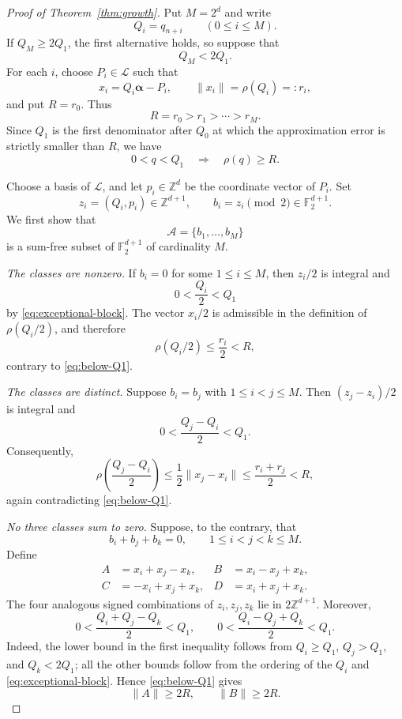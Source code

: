 \documentclass[10pt,a4paper]{amsart}
\newcommand{\F}{\mathbb F}
\newcommand{\Z}{\mathbb Z}
\newcommand{\balpha}{\boldsymbol{\alpha}}
\newcommand{\cL}{\mathcal L}
\begin{document}
\begin{proof}[Proof of Theorem~\ref{thm:growth}]
Put $M=2^d$ and write
$$
 Q_i=q_{n+i}\qquad(0\le i\le M).
$$
If $Q_M\ge2Q_1$, the first alternative holds, so suppose that
\begin{equation}\label{eq:exceptional-block}
 Q_M<2Q_1.
\end{equation}
For each $i$, choose $P_i\in\cL$ such that
$$
 x_i=Q_i\balpha-P_i,
 \qquad \|x_i\|=\rho(Q_i)=:r_i,
$$
and put $R=r_0$. Thus
\begin{equation}\label{eq:errors}
 R=r_0>r_1>\cdots>r_M.
\end{equation}
Since $Q_1$ is the first denominator after $Q_0$ at which the approximation
error is strictly smaller than $R$, we have
\begin{equation}\label{eq:below-Q1}
 0<q<Q_1\quad\Longrightarrow\quad \rho(q)\ge R.
\end{equation}

Choose a basis of $\cL$, and let $p_i\in\Z^d$ be the coordinate vector of
$P_i$. Set
$$
 z_i=(Q_i,p_i)\in\Z^{d+1},
 \qquad b_i=z_i\pmod 2\in\F_2^{d+1}.
$$
We first show that
$$
 \mathcal A=\{b_1,\ldots,b_M\}
$$
is a sum-free subset of $\F_2^{d+1}$ of cardinality $M$.

\smallskip
\noindent\emph{The classes are nonzero.}
If $b_i=0$ for some $1\le i\le M$, then $z_i/2$ is integral and
$$
 0<\frac{Q_i}{2}<Q_1
$$
by \eqref{eq:exceptional-block}. The vector $x_i/2$ is admissible in the
definition of $\rho(Q_i/2)$, and therefore
$$
 \rho(Q_i/2)\le\frac{r_i}{2}<R,
$$
contrary to \eqref{eq:below-Q1}.

\smallskip
\noindent\emph{The classes are distinct.}
Suppose $b_i=b_j$ with $1\le i<j\le M$. Then $(z_j-z_i)/2$ is integral and
$$
 0<\frac{Q_j-Q_i}{2}<Q_1.
$$
Consequently,
$$
 \rho\left(\frac{Q_j-Q_i}{2}\right)
 \le\frac12\|x_j-x_i\|
 \le\frac{r_i+r_j}{2}<R,
$$
again contradicting \eqref{eq:below-Q1}.

\smallskip
\noindent\emph{No three classes sum to zero.}
Suppose, to the contrary, that
\begin{equation}\label{eq:zero-sum-triple}
 b_i+b_j+b_k=0,
 \qquad 1\le i<j<k\le M.
\end{equation}
Define
$$
 \begin{aligned}
 A&=x_i+x_j-x_k,&
 B&=x_i-x_j+x_k,\\
 C&=-x_i+x_j+x_k,&
 D&=x_i+x_j+x_k.
 \end{aligned}
$$
The four analogous signed combinations of $z_i,z_j,z_k$ lie in
$2\Z^{d+1}$. Moreover,
$$
 0<\frac{Q_i+Q_j-Q_k}{2}<Q_1,
 \qquad
 0<\frac{Q_i-Q_j+Q_k}{2}<Q_1.
$$
Indeed, the lower bound in the first inequality follows from
$Q_i\ge Q_1$, $Q_j>Q_1$, and $Q_k<2Q_1$; all the other bounds follow from
the ordering of the $Q_i$ and \eqref{eq:exceptional-block}. Hence
\eqref{eq:below-Q1} gives
\begin{equation}\label{eq:AB-long}
 \|A\|\ge2R,\qquad \|B\|\ge2R.
\end{equation}


\end{proof}
\end{document}
